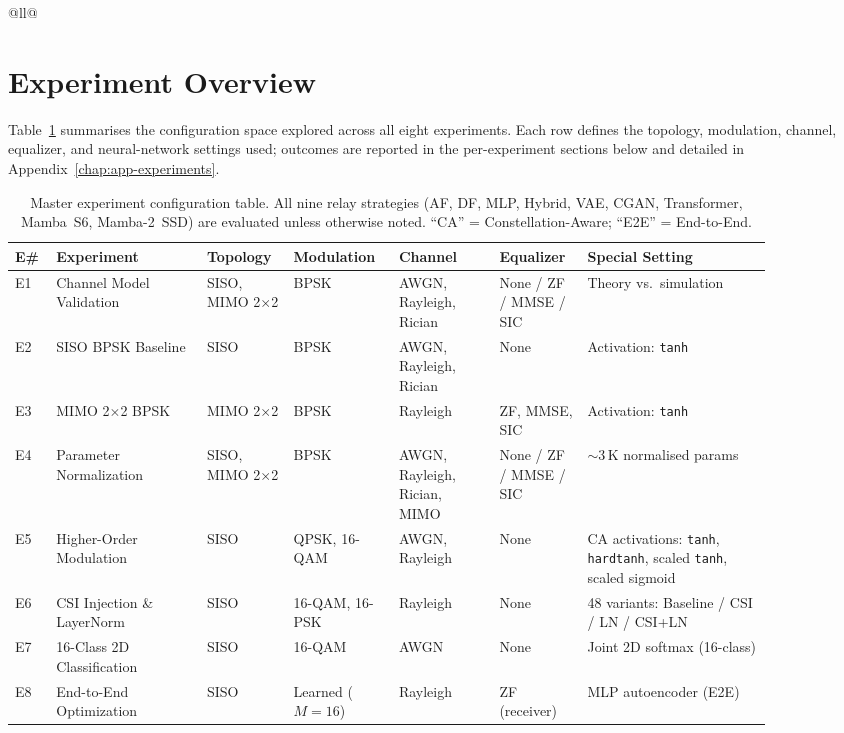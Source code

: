 {\begin{longtable}[]{@{}ll@{}}
\section{Experiment Overview}\label{sec:experiment-overview}

Table~\ref{tbl:master-config} summarises the configuration space explored across all
eight experiments. Each row defines the topology, modulation, channel, equalizer, and
neural-network settings used; outcomes are reported in the per-experiment sections below
and detailed in Appendix~\ref{chap:app-experiments}.

\begin{table}[H]
\centering
\caption{Master experiment configuration table. All nine relay strategies
(AF, DF, MLP, Hybrid, VAE, CGAN, Transformer, Mamba~S6, Mamba-2~SSD) are evaluated
unless otherwise noted. ``CA'' = Constellation-Aware; ``E2E'' = End-to-End.}
\label{tbl:master-config}
\small
\begin{tabular}{@{}p{0.04\linewidth}p{0.18\linewidth}p{0.10\linewidth}p{0.12\linewidth}p{0.12\linewidth}p{0.10\linewidth}p{0.22\linewidth}@{}}
\toprule
\textbf{E\#} & \textbf{Experiment} & \textbf{Topology} & \textbf{Modulation} & \textbf{Channel} & \textbf{Equalizer} & \textbf{Special Setting} \\
\midrule
E1 & Channel Model Validation & SISO, MIMO 2$\times$2 & BPSK & AWGN, Rayleigh, Rician & None / ZF / MMSE / SIC & Theory vs.\ simulation \\
\midrule
E2 & SISO BPSK Baseline & SISO & BPSK & AWGN, Rayleigh, Rician & None & Activation: \texttt{tanh} \\
\midrule
E3 & MIMO 2$\times$2 BPSK & MIMO 2$\times$2 & BPSK & Rayleigh & ZF, MMSE, SIC & Activation: \texttt{tanh} \\
\midrule
E4 & Parameter Normalization & SISO, MIMO 2$\times$2 & BPSK & AWGN, Rayleigh, Rician, MIMO & None / ZF / MMSE / SIC & $\sim$3\,K normalised params \\
\midrule
E5 & Higher-Order Modulation & SISO & QPSK, 16-QAM & AWGN, Rayleigh & None & CA activations: \texttt{tanh}, \texttt{hardtanh}, scaled \texttt{tanh}, scaled sigmoid \\
\midrule
E6 & CSI Injection \& LayerNorm & SISO & 16-QAM, 16-PSK & Rayleigh & None & 48 variants: Baseline / CSI / LN / CSI+LN \\
\midrule
E7 & 16-Class 2D Classification & SISO & 16-QAM & AWGN & None & Joint 2D softmax (16-class) \\
\midrule
E8 & End-to-End Optimization & SISO & Learned ($M{=}16$) & Rayleigh & ZF (receiver) & MLP autoencoder (E2E) \\
\bottomrule
\end{tabular}
\end{table}


\end{longtable}}
